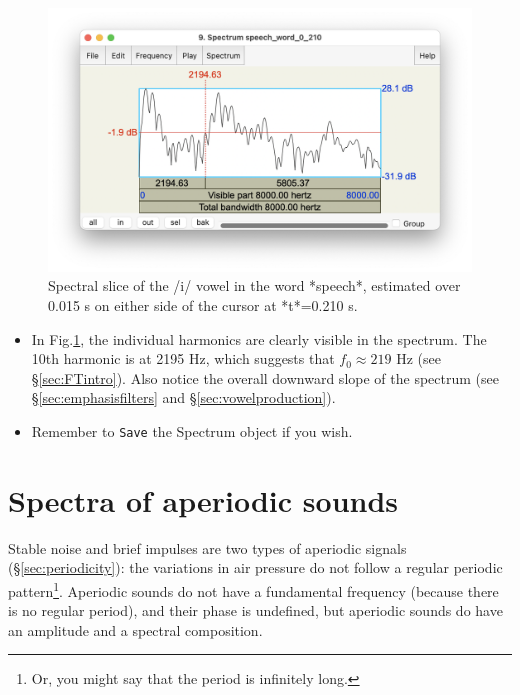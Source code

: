 \documentclass[
]{book}
\begin{document}
\begin{figure}

{\centering \includegraphics{figures/Spectrum_speech_word_0_210} 

}

\caption{Spectral slice of the /i/ vowel in the word *speech*, estimated over 0.015 s on either side of the cursor at *t*=0.210 s. }\label{fig:speech-spectralslice}
\end{figure}

\begin{itemize}
\item
  In Fig.\ref{fig:speech-spectralslice}, the individual harmonics are clearly visible in the spectrum. The 10th harmonic is at 2195 Hz, which suggests that \(f_0 \approx 219\) Hz (see §\ref{sec:FTintro}). Also notice the overall downward slope of the spectrum (see §\ref{sec:emphasisfilters} and §\ref{sec:vowelproduction}).
\item
  Remember to \texttt{Save} the Spectrum object if you wish.
\end{itemize}

\section{Spectra of aperiodic sounds}\label{spectra-of-aperiodic-sounds}

Stable noise and brief impulses are two types of aperiodic signals (§\ref{sec:periodicity}): the variations in air pressure do not follow a regular periodic pattern\footnote{Or, you might say that the period is infinitely long.}. Aperiodic sounds do not have a fundamental frequency (because there is no regular period), and their phase is undefined, but aperiodic sounds do have an amplitude and a spectral composition.
\end{document}
